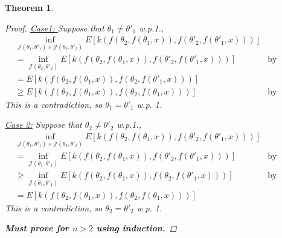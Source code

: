 \documentclass{article}
\theoremstyle{plain}%
\newtheorem{theorem}{Theorem}[section]
\theoremstyle{definition}
\theoremstyle{remark}
\begin{document}
\begin{theorem}
\begin{proof}
			\underline{Case1: } Suppose that  $\theta_1\neq \theta'_1$ w.p.1., 
			\begin{align*}
				&\inf_{ \mathcal{J}(\theta_1,\theta'_1)\times \mathcal{J}(\theta_2,\theta'_2)}E[k(f(\theta_2,f(\theta_1,x)),f(\theta'_2,f(\theta'_1,x)))]\\&= \inf_{\mathcal{J}(\theta_2,\theta'_2)} E[k(f(\theta_2,f(\theta_1,x)),f(\theta'_2,f(\theta'_1,x)))] &\text{by assumption}\\
				& =E[k(f(\theta_2,f(\theta_1,x)),f(\theta_2,f(\theta'_1,x)))]\\
				&\geq E[k(f(\theta_2,f(\theta_1,x)),f(\theta_2,f(\theta_1,x)))] &\text{by condition 2}
			\end{align*}
			This is a contradiction, so $\theta_1=\theta'_1$ w.p. 1.
			
			\underline{Case 2:} Suppose that  $\theta_2\neq \theta'_2$ w.p.1., 
			\begin{align*}
				&\inf_{ \mathcal{J}(\theta_1,\theta'_1)\times \mathcal{J}(\theta_2,\theta'_2)}E[k(f(\theta_2,f(\theta_1,x)),f(\theta'_2,f(\theta'_1,x)))]\\&= \inf_{\mathcal{J}(\theta_1,\theta'_1)} E[k(f(\theta_2,f(\theta_1,x)),f(\theta'_2,f(\theta'_1,x)))]  &\text{by assumption}\\
				& \geq \inf_{\mathcal{J}(\theta_1,\theta'_1)} E[k(f(\theta_2,f(\theta_1,x)),f(\theta_2,f(\theta'_1,x)))] &\text{by condition 2}\\
				&= E[k(f(\theta_2,f(\theta_1,x)),f(\theta_2,f(\theta_1,x)))] 
			\end{align*}
			This is a contradiction, so $\theta_2=\theta'_2$ w.p. 1.
			
			\textbf{Must prove for $n>2$ using induction.}
		\end{proof}
		
	\end{theorem}
	
\end{document}

